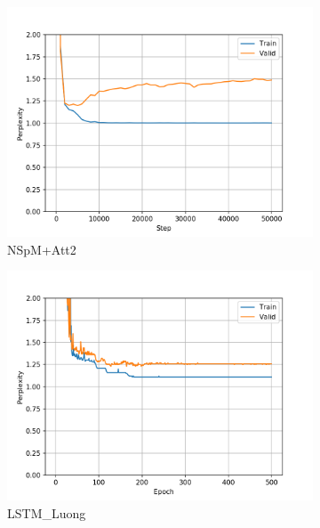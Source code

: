\begin{figure}[h]
\begin{subfigure}{0.3\textwidth}
\includegraphics[width=\textwidth]{../results/monument2_1/run1/neural_sparql_machine_luong_attention/ppls.png} 
\caption{NSpM+Att2}
\label{fig:monu1 nsm-luo ppl}
\end{subfigure}
\hfill
\begin{subfigure}{0.3\textwidth}
\includegraphics[width=\textwidth]{../results/monument2_1/run1/lstm_luong_wmt_en_de/ppls.png}
\caption{LSTM\_Luong}
\label{fig:monu1 lstm ppl}
\end{subfigure}
\hfill
\begin{subfigure}{0.3\textwidth}

\end{subfigure}
\end{figure}
